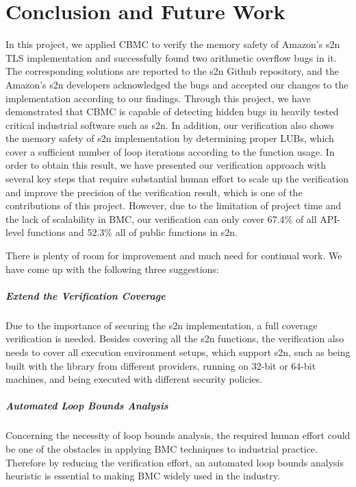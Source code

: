 \chapter{Conclusion and Future Work}
In this project, we applied CBMC to verify the memory safety of Amazon's s2n TLS implementation and successfully found two arithmetic overflow bugs in it. The corresponding solutions are reported to the s2n Github repository, and the Amazon's s2n developers acknowledged the bugs and accepted our changes to the implementation according to our findings. Through this project, we have demonstrated that CBMC is capable of detecting hidden bugs in heavily tested critical industrial software such as s2n. In addition, our verification also shows the memory safety of s2n implementation by determining proper LUBs, which cover a sufficient number of loop iterations according to the function usage. In order to obtain this result, we have presented our verification approach with several key steps that require substantial human effort to scale up the verification and improve the precision of the verification result, which is one of the contributions of this project. However, due to the limitation of project time and the lack of scalability in BMC, our verification can only cover 67.4\% of all API-level functions and 52.3\% all of public functions in s2n.

There is plenty of room for improvement and much need for continual work. We have come up with the following three suggestions:

\paragraph{Extend the Verification Coverage} Due to the importance of securing the s2n implementation, a full coverage verification is needed. Besides covering all the s2n functions, the verification also needs to cover all execution environment setups, which support s2n, such as being built with the  library from different providers, running on 32-bit or 64-bit machines, and being executed with different security policies.

\paragraph{Automated Loop Bounds Analysis} Concerning the necessity of loop bounds analysis, the required human effort could be one of the obstacles in applying BMC techniques to industrial practice. Therefore by reducing the verification effort, an automated loop bounds analysis heuristic is essential to making BMC widely used in the industry.

